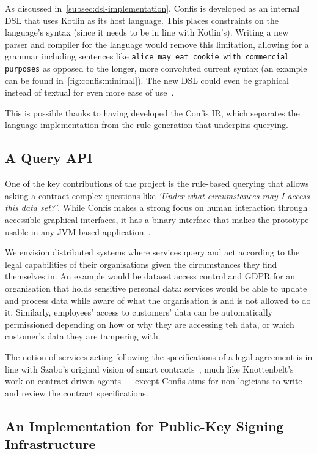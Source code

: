As discussed in~\autoref{subsec:dsl-implementation}, Confis is developed as an internal DSL that uses Kotlin as its host language.
This places constraints on the language's syntax (since it needs to be in line with Kotlin's).
Writing a new parser and compiler for the language would remove this limitation, allowing for a grammar including sentences like \texttt{alice may eat cookie with commercial purposes} as opposed to the longer, more convoluted current syntax (an example can be found in~\autoref{fig:confis:minimal}).
The new DSL could even be graphical instead of textual for even more ease of use~\cite{fowlerLangWorkbench}.

This is possible thanks to having developed the Confis IR, which separates the language implementation from the rule generation that underpins querying.

\subsection{A Query API}\label{subsec:future:query-api}
One of the key contributions of the project is the rule-based querying that allows asking a contract complex questions like \emph{`Under what circumstances may I access this data set?'}.
While Confis makes a strong focus on human interaction through accessible graphical interfaces, it has a binary interface that makes the prototype usable in any JVM-based application~\cite{venners1998java}.


We envision distributed systems where services query and act according to the legal capabilities of their organisations given the circumstances they find themselves in.
An example would be dataset access control and GDPR for an organisation that holds sensitive personal data: services would be able to update and process data while aware of what the organisation is and is not allowed to do it.
Similarly, employees' access to customers' data can be automatically permissioned depending on how or why they are accessing teh data, or which customer's data they are tampering with.

The notion of services acting following the specifications of a legal agreement is in line with Szabo's original vision of smart contracts~\cite{szabo1997smart-contracts}, much like Knottenbelt's work on contract-driven agents~\cite{knottenbeltContractDriven} -- except Confis aims for non-logicians to write and review the contract specifications.

\subsection{An Implementation for Public-Key Signing Infrastructure}\label{subsec:future:signing}

